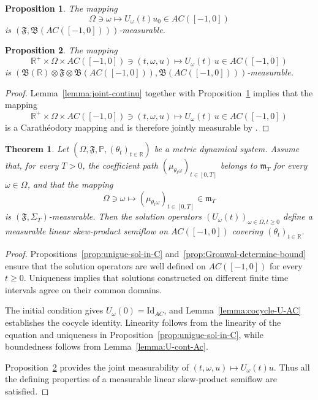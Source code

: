 \documentclass[reqno]{amsart}
\theoremstyle{plain}
\newtheorem{theorem}{Theorem}[section]
\newtheorem{proposition}{Proposition}[section]
\numberwithin{equation}{section}
\numberwithin{definition}{section}
\newcommand\RR{\ensuremath{\mathbb{R}}}
\begin{document}
\begin{proposition}\label{prop:U-measure} The mapping 
\begin{equation*}
     \Omega \ni \omega \mapsto U_\omega(t)u_0 \in AC([-1,0])
\end{equation*}
is $(\mathfrak{F},\mathfrak{B}(AC([-1,0])))$-measurable.
\end{proposition}

\begin{proposition}\label{prop:U-joint-measure} The mapping 
    \begin{equation*}
 \RR^{+} \times \Omega \times AC([-1,0]) \ni (t,\omega,u) \mapsto U_{\omega}(t)\,u \in AC([-1,0]) 
\end{equation*} 
is $(\mathfrak{B}(\RR)\otimes\mathfrak{F}\otimes \mathfrak{B}(AC([-1,0])),\mathfrak{B}(AC([-1,0])))$-measurable.
\end{proposition}
\begin{proof}
    Lemma~\ref{lemma:joint-continu} together with Proposition~\ref{prop:U-measure} implies that the mapping 
    \begin{equation*}
        \RR^{+} \times \Omega \times AC([-1,0]) \ni (t,\omega,u) \mapsto U_{\omega}(t)\,u \in AC([-1,0])
    \end{equation*}
    is a  Carath\'eodory mapping and is therefore jointly measurable by \cite[Lemma 4.51]{AliB}. 
\end{proof}

\begin{theorem}
    \label{thm:AC-measurable-semiflow}
Let $(\Omega,\mathfrak F,\mathbb P,(\theta_t)_{t\in\mathbb R})$
be a metric dynamical system. Assume that, for every $T>0$,
the coefficient path $(\mu_{\theta_t\omega})_{t\in[0,T]}$ belongs to $\mathfrak m_T$ for every $\omega\in\Omega$, and
that the mapping
\begin{equation*}
    \Omega\ni\omega
    \mapsto
    (\mu_{\theta_t\omega})_{t\in[0,T]}
    \in\mathfrak m_T
\end{equation*}
is $(\mathfrak F,\Sigma_T)$-measurable. Then the solution operators $(U_\omega(t))_{\omega\in\Omega,t\geq0}$
define a measurable linear skew-product semiflow on
$AC([-1,0])$ covering $(\theta_t)_{t\in\mathbb R}$.
\end{theorem}

\begin{proof}
Propositions~\ref{prop:unigue-sol-in-C} and~\ref{prop:Gronwal-determine-bound} ensure that the solution operators
are well defined on $AC([-1,0])$ for every $t\geq0$.
Uniqueness implies that solutions constructed on different
finite time intervals agree on their common domains.

The initial condition gives $U_\omega(0)=\mathrm{Id}_{AC}$,
and Lemma~\ref{lemma:cocycle-U-AC} establishes the cocycle identity. Linearity follows from the linearity of the equation and
uniqueness in Proposition~\ref{prop:unigue-sol-in-C}, while boundedness follows
from Lemma~\ref{lemma:U-cont-Ac}.

Proposition~\ref{prop:U-joint-measure} provides the joint measurability of
$(t,\omega,u)\mapsto U_\omega(t)u$.
Thus all the defining properties of a measurable linear
skew-product semiflow are satisfied.
\end{proof}
\end{document}
